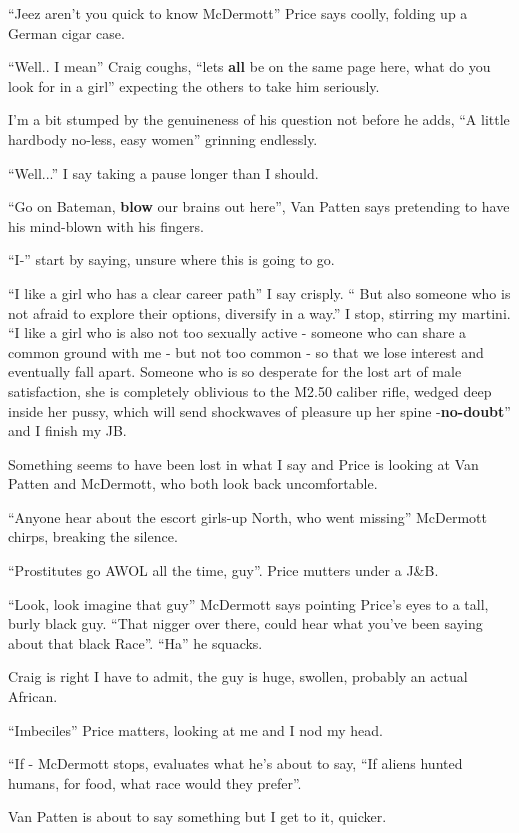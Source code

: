 \documentclass[19pt,openany]{book}
\begin{document}
``Jeez aren't you quick to
know McDermott'' Price
says coolly, folding up a
German cigar case.

``Well.. I mean'' Craig
coughs, ``lets \textbf{all}
be on the same page here,
what do you look for in a girl''
expecting the others to take him
seriously.

I'm a bit stumped by the genuineness
of his question not before
he adds, ``A little hardbody
no-less, easy women'' grinning
endlessly.


``Well...'' I say taking a pause
longer than I should.

``Go on Bateman, \textbf{blow}
our brains out here'', Van Patten
says pretending to have his
mind-blown with his fingers.

``I-'' start
by saying, unsure
where this is going to go.

``I like a girl
who has a clear career path''
I say crisply. ``
But also someone who is not afraid to
explore their options,
diversify in a way.'' I
stop, stirring
my martini. ``I like a girl who is
also not too sexually active - someone
who can share a common ground with me
- but not too common - so that
we lose interest and eventually fall
apart. Someone who is so desperate
for the lost art of male satisfaction,
she is completely oblivious
to the M2.50 caliber rifle, wedged deep inside
her pussy, which will send shockwaves
of pleasure up her spine
-\textbf{no-doubt}'' and I
finish my JB.

Something seems to have
been lost in what I say
and Price is looking
at Van Patten and McDermott,
who both look back uncomfortable.

``Anyone hear about the escort
girls-up North, who went missing'' McDermott
chirps, breaking the silence.

``Prostitutes go AWOL all the time,
guy''. Price mutters under
a J\&B.


``Look, look imagine that
guy'' McDermott
says pointing Price's eyes to a
tall, burly black guy.
``That nigger over there,
could hear what you've been
saying about that black Race''.
``Ha'' he squacks.

Craig is right I have to admit,
the guy is huge, swollen, probably an actual
African.

``Imbeciles'' Price matters, looking
at me and I nod my head.

``If - McDermott stops, evaluates
what he's about to say, ``If aliens
hunted humans, for food, what race would
they prefer''.

Van Patten is about to say something but
I get to it, quicker.
\end{document}

